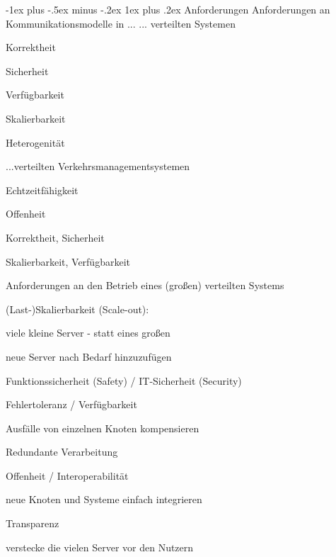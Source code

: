 \documentclass[10pt]{article}
\makeatletter
\renewcommand{\subsubsection}{\@startsection{subsubsection}{3}{0mm}%
                                {-1ex plus -.5ex minus -.2ex}%
                                {1ex plus .2ex}%
                                {\normalfont\small\bfseries}}
\makeatother
\begin{document}
\subsubsection{Anforderungen}
\color{orange} Anforderungen an Kommunikationsmodelle in ... \color{black}
\newline
... verteilten Systemen
\begin{itemize*}
  \item Korrektheit
  \item Sicherheit
  \item Verfügbarkeit
  \item Skalierbarkeit
  \item Heterogenität
\end{itemize*}

...verteilten Verkehrsmanagementsystemen
\begin{itemize*}
  \item Echtzeitfähigkeit
  \item Offenheit
  \item Korrektheit, Sicherheit
  \item Skalierbarkeit, Verfügbarkeit
\end{itemize*}

\color{orange} Anforderungen \color{black} an den Betrieb eines (großen) verteilten Systems
\begin{itemize*}
  \item (Last-)Skalierbarkeit (Scale-out):
  \begin{itemize*}
    \item viele kleine Server - statt eines großen
    \item neue Server nach Bedarf hinzuzufügen
  \end{itemize*}
  \item Funktionssicherheit (Safety) / IT-Sicherheit (Security)
  \item Fehlertoleranz / Verfügbarkeit
  \begin{itemize*}
    \item Ausfälle von einzelnen Knoten kompensieren
    \item Redundante Verarbeitung
  \end{itemize*}
  \item Offenheit / Interoperabilität
  \begin{itemize*}
    \item neue Knoten und Systeme einfach integrieren
  \end{itemize*}
  \item Transparenz
  \begin{itemize*}
    \item verstecke die vielen Server vor den Nutzern
  \end{itemize*}
\end{itemize*}
\end{document}
